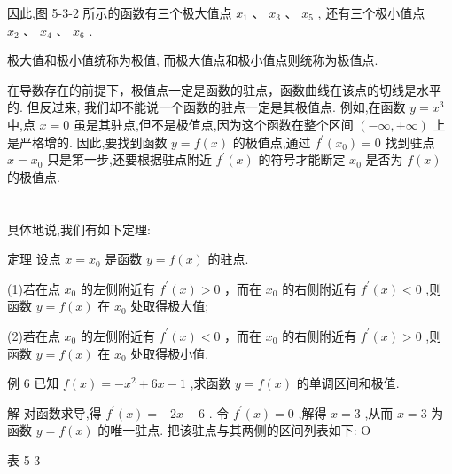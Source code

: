 \documentclass[10pt]{article}
\begin{document}
因此,图 5-3-2 所示的函数有三个极大值点 \({x}_{1}\text{ 、 }{x}_{3}\text{ 、 }{x}_{5}\) , 还有三个极小值点 \({x}_{2}\text{ 、 }{x}_{4}\text{ 、 }{x}_{6}\) .

极大值和极小值统称为极值, 而极大值点和极小值点则统称为极值点.

在导数存在的前提下，极值点一定是函数的驻点，函数曲线在该点的切线是水平的. 但反过来, 我们却不能说一个函数的驻点一定是其极值点. 例如,在函数 \(y = {x}^{3}\) 中,点 \(x = 0\) 虽是其驻点,但不是极值点,因为这个函数在整个区间 \(\left( {-\infty , + \infty }\right)\) 上是严格增的. 因此,要找到函数 \(y = f\left( x\right)\) 的极值点,通过 \({f}^{\prime }\left( {x}_{0}\right)  = 0\) 找到驻点 \(x = {x}_{0}\) 只是第一步,还要根据驻点附近 \({f}^{\prime }\left( x\right)\) 的符号才能断定 \({x}_{0}\) 是否为 \(f\left( x\right)\) 的极值点.

\section*{}



具体地说,我们有如下定理:

定理 设点 \(x = {x}_{0}\) 是函数 \(y = f\left( x\right)\) 的驻点.

(1)若在点 \({x}_{0}\) 的左侧附近有 \({f}^{\prime }\left( x\right)  > 0\) ，而在 \({x}_{0}\) 的右侧附近有 \({f}^{\prime }\left( x\right)  < 0\) ,则函数 \(y = f\left( x\right)\) 在 \({x}_{0}\) 处取得极大值;

(2)若在点 \({x}_{0}\) 的左侧附近有 \({f}^{\prime }\left( x\right)  < 0\) ，而在 \({x}_{0}\) 的右侧附近有 \({f}^{\prime }\left( x\right)  > 0\) ,则函数 \(y = f\left( x\right)\) 在 \({x}_{0}\) 处取得极小值.

例 6 已知 \(f\left( x\right)  =  - {x}^{2} + {6x} - 1\) ,求函数 \(y = f\left( x\right)\) 的单调区间和极值.

解 对函数求导,得 \({f}^{\prime }\left( x\right)  =  - {2x} + 6\) . 令 \({f}^{\prime }\left( x\right)  = 0\) ,解得 \(x = 3\) ,从而 \(x = 3\) 为函数 \(y = f\left( x\right)\) 的唯一驻点. 把该驻点与其两侧的区间列表如下: O

表 5-3

\begin{center}
\end{center}
\end{document}
